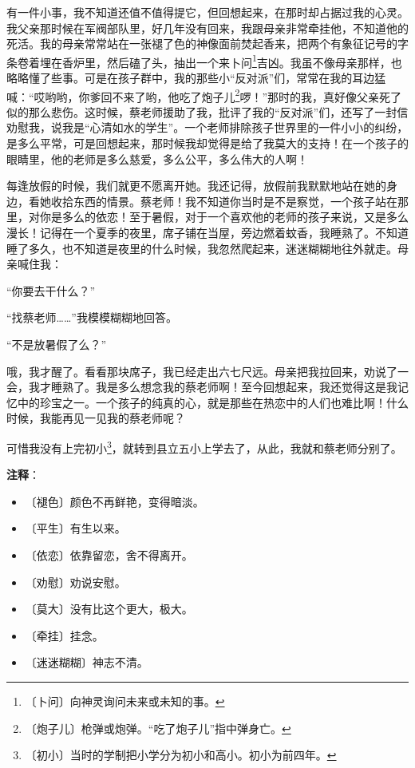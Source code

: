 \documentclass[12pt,UTF-8,openany]{ctexbook}
\begin{document}
\begin{large}
    有一件小事，我不知道还值不值得提它，但回想起来，在那时却占据过我的心灵。我父亲那时候在军阀部队里，好几年没有回来，我跟母亲非常牵挂他，不知道他的死活。我的母亲常常站在一张褪了色的神像面前焚起香来，把两个有象征记号的字条卷着埋在香炉里，然后磕了头，抽出一个来卜问\footnote{〔卜问〕向神灵询问未来或未知的事。}吉凶。我虽不像母亲那样，也略略懂了些事。可是在孩子群中，我的那些小“反对派”们，常常在我的耳边猛喊：“哎哟哟，你爹回不来了哟，他吃了炮子儿\footnote{〔炮子儿〕枪弹或炮弹。“吃了炮子儿”指中弹身亡。}啰！”那时的我，真好像父亲死了似的那么悲伤。这时候，蔡老师援助了我，批评了我的“反对派”们，还写了一封信劝慰我，说我是“心清如水的学生”。一个老师排除孩子世界里的一件小小的纠纷，是多么平常，可是回想起来，那时候我却觉得是给了我莫大的支持！在一个孩子的眼睛里，他的老师是多么慈爱，多么公平，多么伟大的人啊！
    
    每逢放假的时候，我们就更不愿离开她。我还记得，放假前我默默地站在她的身边，看她收拾东西的情景。蔡老师！我不知道你当时是不是察觉，一个孩子站在那里，对你是多么的依恋！至于暑假，对于一个喜欢他的老师的孩子来说，又是多么漫长！记得在一个夏季的夜里，席子铺在当屋，旁边燃着蚊香，我睡熟了。不知道睡了多久，也不知道是夜里的什么时候，我忽然爬起来，迷迷糊糊地往外就走。母亲喊住我：
    
    “你要去干什么？”
    
    “找蔡老师……”我模模糊糊地回答。
    
    “不是放暑假了么？”
    
    哦，我才醒了。看看那块席子，我已经走出六七尺远。母亲把我拉回来，劝说了一会，我才睡熟了。我是多么想念我的蔡老师啊！至今回想起来，我还觉得这是我记忆中的珍宝之一。一个孩子的纯真的心，就是那些在热恋中的人们也难比啊！什么时候，我能再见一见我的蔡老师呢？
    
    可惜我没有上完初小\footnote{〔初小〕当时的学制把小学分为初小和高小。初小为前四年。}，就转到县立五小上学去了，从此，我就和蔡老师分别了。
    
\end{large}


\newpage

\textbf{注释}：

\vspace{-1em}

\begin{itemize}
    \setlength\itemsep{-0.2em}
    \item 〔褪色〕颜色不再鲜艳，变得暗淡。
    \item 〔平生〕有生以来。
    \item 〔依恋〕依靠留恋，舍不得离开。
    \item 〔劝慰〕劝说安慰。
    \item 〔莫大〕没有比这个更大，极大。
    \item 〔牵挂〕挂念。
    \item 〔迷迷糊糊〕神志不清。
\end{itemize}
\end{document}
